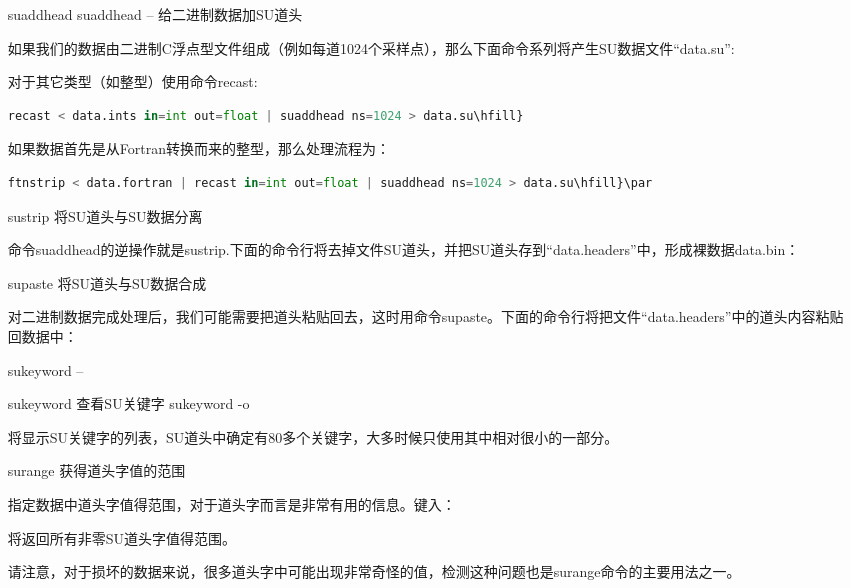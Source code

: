 \begin{enumerate}
	\item[suaddhead] suaddhead – 给二进制数据加SU道头 \par
	如果我们的数据由二进制C浮点型文件组成（例如每道1024个采样点），那么下面命令系列将产生SU数据文件“data.su”:\par
	\par
	对于其它类型（如整型）使用命令recast:
\begin{lstlisting}[language=python]
recast < data.ints in=int out=float | suaddhead ns=1024 > data.su\hfill}
\end{lstlisting}
	如果数据首先是从Fortran转换而来的整型，那么处理流程为：
\begin{lstlisting}[language=python]
ftnstrip < data.fortran | recast in=int out=float | suaddhead ns=1024 > data.su\hfill}\par
\end{lstlisting}
	\item[sustrip] 将SU道头与SU数据分离\par
	命令suaddhead的逆操作就是sustrip.下面的命令行将去掉文件SU道头，并把SU道头存到“data.headers”中，形成裸数据data.bin：\par
	\item[supaste] 将SU道头与SU数据合成\par
	对二进制数据完成处理后，我们可能需要把道头粘贴回去，这时用命令supaste。下面的命令行将把文件“data.headers”中的道头内容粘贴回数据中：\par
	\par
	\par sukeyword – \item[sukeyword] 查看SU关键字 sukeyword -o\par
	将显示SU关键字的列表，SU道头中确定有80多个关键字，大多时候只使用其中相对很小的一部分。
	\item[surange] 获得道头字值的范围\par
	指定数据中道头字值得范围，对于道头字而言是非常有用的信息。键入：\par
	\par
	将返回所有非零SU道头字值得范围。\par
	请注意，对于损坏的数据来说，很多道头字中可能出现非常奇怪的值，检测这种问题也是surange命令的主要用法之一。

\end{enumerate}
